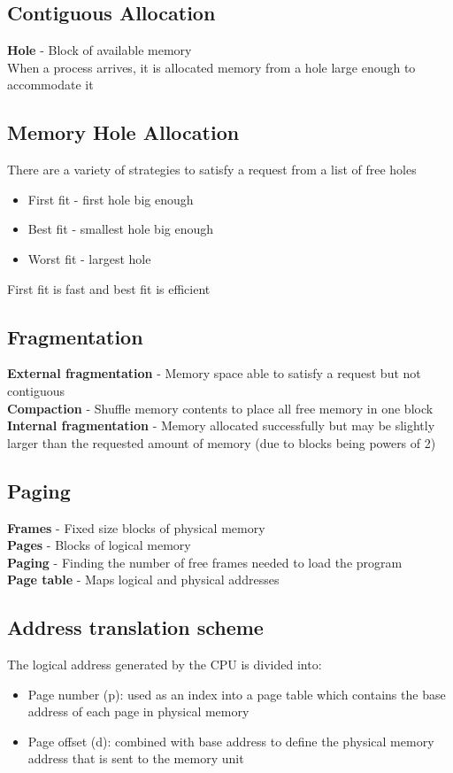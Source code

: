\documentclass{article}[18pt]
\begin{document}
\subsection{Contiguous Allocation}
\textbf{Hole} - Block of available memory\\
When a process arrives, it is allocated memory from a hole large enough to accommodate it
\subsection{Memory Hole Allocation}
There are a variety of strategies to satisfy a request from a list of free holes
\begin{itemize}
	\item First fit - first hole big enough
	\item Best fit - smallest hole big enough
	\item Worst fit - largest hole
\end{itemize}
First fit is fast and best fit is efficient
\subsection{Fragmentation}
\textbf{External fragmentation} - Memory space able to satisfy a request but not contiguous\\
\textbf{Compaction} - Shuffle memory contents to place all free memory in one block\\
\textbf{Internal fragmentation} - Memory allocated successfully but may be slightly larger than the requested amount of memory (due to blocks being powers of 2)
\subsection{Paging}
\textbf{Frames} - Fixed size blocks of physical memory\\
\textbf{Pages} - Blocks of logical memory\\
\textbf{Paging} - Finding the number of free frames needed to load the program\\
\textbf{Page table} - Maps logical and physical addresses
\subsection{Address translation scheme}
The logical address generated by the CPU is divided into:
\begin{itemize}
	\item Page number (p): used as an index into a page table which contains the base address of each page in physical memory
	\item Page offset (d): combined with base address to define the physical memory address that is sent to the memory unit
\end{itemize}
\end{document}
